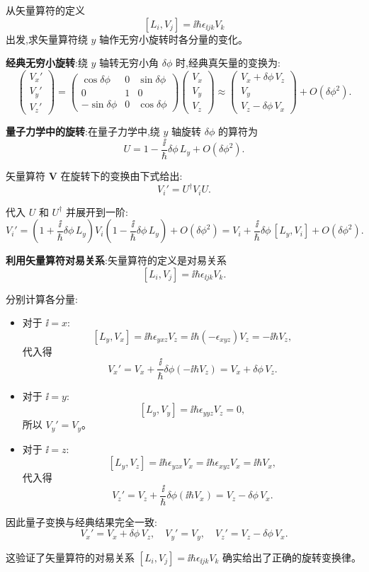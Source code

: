 \begin{question}
从矢量算符的定义
\[
[L_i,V_j]=\ii\hbar\epsilon_{\ii jk}V_k
\]
出发,求矢量算符绕 $y$ 轴作无穷小旋转时各分量的变化。
\end{question}
\begin{solution}
	\textbf{经典无穷小旋转}:绕 $y$ 轴转无穷小角 $\delta\phi$ 时,经典真矢量的变换为:
	\[
	\begin{pmatrix}V_x'\\V_y'\\V_z'\end{pmatrix}
	= \begin{pmatrix}\cos\delta\phi&0&\sin\delta\phi\\0&1&0\\-\sin\delta\phi&0&\cos\delta\phi\end{pmatrix}
	\begin{pmatrix}V_x\\V_y\\V_z\end{pmatrix}
	\approx \begin{pmatrix}V_x + \delta\phi\,V_z\\V_y\\V_z - \delta\phi\,V_x\end{pmatrix}+O(\delta\phi^2).
	\]

	\textbf{量子力学中的旋转}:在量子力学中,绕 $y$ 轴旋转 $\delta\phi$ 的算符为
	\[
	U = 1 - \frac{\ii}{\hbar}\delta\phi\,L_y + O(\delta\phi^2).
	\]

	矢量算符 $\mathbf V$ 在旋转下的变换由下式给出:
	\[
	V_i' = U^\dagger V_i U.
	\]

	代入 $U$ 和 $U^\dagger$ 并展开到一阶:
	\[
	V_i' = \left(1+\frac{\ii}{\hbar}\delta\phi\,L_y\right) V_i \left(1-\frac{\ii}{\hbar}\delta\phi\,L_y\right) + O(\delta\phi^2)
	= V_i + \frac{\ii}{\hbar}\delta\phi\,[L_y,V_i] + O(\delta\phi^2).
	\]

	\textbf{利用矢量算符对易关系}:矢量算符的定义是对易关系
	\[
	[L_i,V_j] = \ii\hbar\epsilon_{\ii jk}V_k.
	\]

	分别计算各分量:
	\begin{itemize}
	\item 对于 $\ii=x$:
	\[
	[L_y,V_x] = \ii\hbar\epsilon_{yxz}V_z = \ii\hbar(-\epsilon_{xyz})V_z = -\ii\hbar V_z,
	\]
	代入得
	\[
	V_x' = V_x + \frac{\ii}{\hbar}\delta\phi(-\ii\hbar V_z) = V_x + \delta\phi\,V_z.
	\]

	\item 对于 $\ii=y$:
	\[
	[L_y,V_y] = \ii\hbar\epsilon_{yyz}V_z = 0,
	\]
	所以 $V_y' = V_y$。

	\item 对于 $\ii=z$:
	\[
	[L_y,V_z] = \ii\hbar\epsilon_{yzx}V_x = \ii\hbar\epsilon_{xyz}V_x = \ii\hbar V_x,
	\]
	代入得
	\[
	V_z' = V_z + \frac{\ii}{\hbar}\delta\phi(\ii\hbar V_x) = V_z - \delta\phi\,V_x.
	\]
	\end{itemize}

	因此量子变换与经典结果完全一致:
	\[
	\boxed{V_x' = V_x + \delta\phi\,V_z,\quad V_y' = V_y,\quad V_z' = V_z - \delta\phi\,V_x}.
	\]

	这验证了矢量算符的对易关系 $[L_i,V_j]=\ii\hbar\epsilon_{\ii jk}V_k$ 确实给出了正确的旋转变换律。
	\end{solution}

